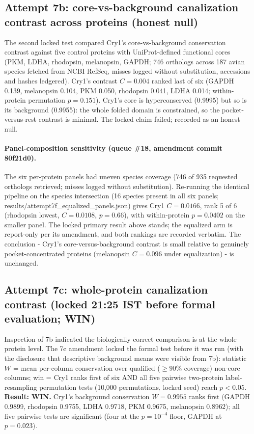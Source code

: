 \documentclass[12pt,a4paper]{article}
\begin{document}
\subsection{Attempt 7b: core-vs-background canalization contrast across proteins (honest null)}
The second locked test compared Cry1's core-vs-background conservation contrast against five control proteins with UniProt-defined functional cores (PKM, LDHA, rhodopsin, melanopsin, GAPDH; 746 orthologs across 187 avian species fetched from NCBI RefSeq, misses logged without substitution, accessions and hashes ledgered). Cry1's contrast $C=0.004$ ranked last of six (GAPDH 0.139, melanopsin 0.104, PKM 0.050, rhodopsin 0.041, LDHA 0.014; within-protein permutation $p=0.151$). Cry1's core is hyperconserved (0.9995) but so is its background (0.9955): the whole folded domain is constrained, so the pocket-versus-rest contrast is minimal. The locked claim failed; recorded as an honest null. \paragraph{Panel-composition sensitivity (queue \#18, amendment commit 80f21d0).} The six per-protein panels had uneven species coverage (746 of 935 requested orthologs retrieved; misses logged without substitution). Re-running the identical pipeline on the species intersection (16 species present in all six panels; results/attempt7f\_equalized\_panels.json) gives Cry1 $C=0.0166$, rank 5 of 6 (rhodopsin lowest, $C=0.0108$, $p=0.66$), with within-protein $p=0.0402$ on the smaller panel. The locked primary result above stands; the equalized arm is report-only per its amendment, and both rankings are recorded verbatim. The conclusion - Cry1's core-versus-background contrast is small relative to genuinely pocket-concentrated proteins (melanopsin $C=0.096$ under equalization) - is unchanged.

\subsection{Attempt 7c: whole-protein canalization contrast (locked 21:25 IST before formal evaluation; WIN)}
Inspection of 7b indicated the biologically correct comparison is at the whole-protein level. The 7c amendment locked the formal test before it was run (with the disclosure that descriptive background means were visible from 7b): statistic $W$ = mean per-column conservation over qualified ($\geq 90\%$ coverage) non-core columns; win = Cry1 ranks first of six AND all five pairwise two-protein label-resampling permutation tests (10{,}000 permutations, locked seed) reach $p<0.05$. \textbf{Result: WIN.} Cry1's background conservation $W=0.9955$ ranks first (GAPDH 0.9899, rhodopsin 0.9755, LDHA 0.9718, PKM 0.9675, melanopsin 0.8962); all five pairwise tests are significant (four at the $p=10^{-4}$ floor, GAPDH at $p=0.023$).
\end{document}
